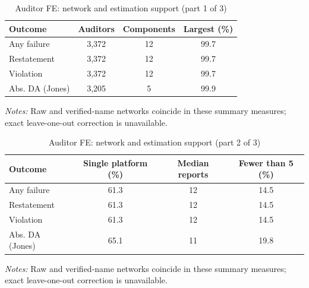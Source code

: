 \begin{table}[htbp]
\footnotesize
\centering
\caption{Auditor FE: network and estimation support (part 1 of 3)}
\begin{threeparttable}
\begin{tabular}{p{}ccc}
\toprule
Outcome & Auditors & Components & Largest (\%) \\
\midrule
Any failure & 3,372 & 12 & 99.7 \\
Restatement & 3,372 & 12 & 99.7 \\
Violation & 3,372 & 12 & 99.7 \\
Abs. DA (Jones) & 3,205 & 5 & 99.9 \\
\bottomrule
\end{tabular}
\begin{tablenotes}\footnotesize
\item \raggedright \textit{Notes:} Raw and verified-name networks coincide in these summary measures; exact leave-one-out correction is unavailable.
\end{tablenotes}
\end{threeparttable}
\end{table}

\begin{table}[htbp]
\footnotesize
\centering
\caption{Auditor FE: network and estimation support (part 2 of 3)}
\begin{threeparttable}
\begin{tabular}{p{}ccc}
\toprule
Outcome & Single platform (\%) & Median reports & Fewer than 5 (\%) \\
\midrule
Any failure & 61.3 & 12 & 14.5 \\
Restatement & 61.3 & 12 & 14.5 \\
Violation & 61.3 & 12 & 14.5 \\
Abs. DA (Jones) & 65.1 & 11 & 19.8 \\
\bottomrule
\end{tabular}
\begin{tablenotes}\footnotesize
\item \raggedright \textit{Notes:} Raw and verified-name networks coincide in these summary measures; exact leave-one-out correction is unavailable.
\end{tablenotes}
\end{threeparttable}
\end{table}

